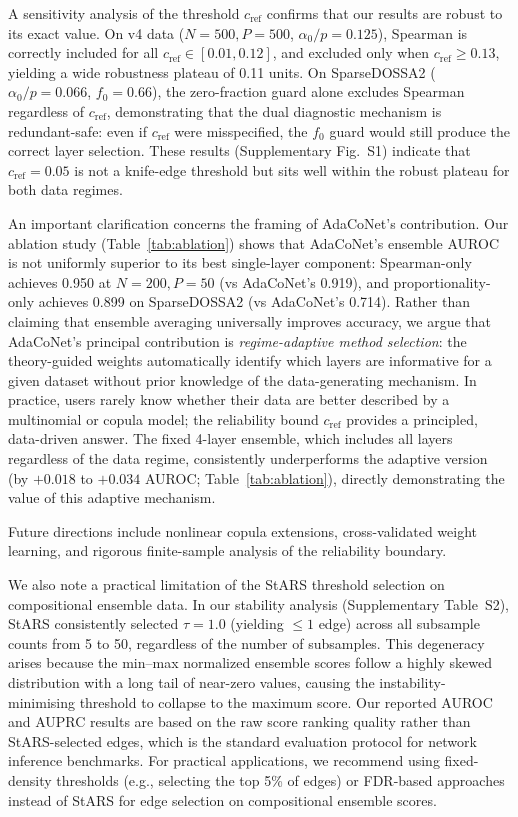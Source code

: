 \documentclass[unnumsec,webpdf,contemporary,large,numbered]{oup-authoring-template}
\theoremstyle{plain}
\theoremstyle{definition}
\begin{document}
A sensitivity analysis of the threshold $c_{\text{ref}}$ confirms that our results are robust to its exact value. On v4 data ($N{=}500, P{=}500$, $\alpha_0/p = 0.125$), Spearman is correctly included for all $c_{\text{ref}} \in [0.01, 0.12]$, and excluded only when $c_{\text{ref}} \geq 0.13$, yielding a wide robustness plateau of 0.11 units. On SparseDOSSA2 ($\alpha_0/p = 0.066$, $f_0 = 0.66$), the zero-fraction guard alone excludes Spearman regardless of $c_{\text{ref}}$, demonstrating that the dual diagnostic mechanism is redundant-safe: even if $c_{\text{ref}}$ were misspecified, the $f_0$ guard would still produce the correct layer selection. These results (Supplementary Fig.~S1) indicate that $c_{\text{ref}} = 0.05$ is not a knife-edge threshold but sits well within the robust plateau for both data regimes.

An important clarification concerns the framing of AdaCoNet's contribution. Our ablation study (Table~\ref{tab:ablation}) shows that AdaCoNet's ensemble AUROC is not uniformly superior to its best single-layer component: Spearman-only achieves 0.950 at $N{=}200, P{=}50$ (vs AdaCoNet's 0.919), and proportionality-only achieves 0.899 on SparseDOSSA2 (vs AdaCoNet's 0.714). Rather than claiming that ensemble averaging universally improves accuracy, we argue that AdaCoNet's principal contribution is \emph{regime-adaptive method selection}: the theory-guided weights automatically identify which layers are informative for a given dataset without prior knowledge of the data-generating mechanism. In practice, users rarely know whether their data are better described by a multinomial or copula model; the reliability bound $c_{\text{ref}}$ provides a principled, data-driven answer. The fixed 4-layer ensemble, which includes all layers regardless of the data regime, consistently underperforms the adaptive version (by $+0.018$ to $+0.034$ AUROC; Table~\ref{tab:ablation}), directly demonstrating the value of this adaptive mechanism.

Future directions include nonlinear copula extensions, cross-validated weight learning, and rigorous finite-sample analysis of the reliability boundary.

We also note a practical limitation of the StARS threshold selection on compositional ensemble data. In our stability analysis (Supplementary Table~S2), StARS consistently selected $\tau = 1.0$ (yielding $\leq 1$ edge) across all subsample counts from 5 to 50, regardless of the number of subsamples. This degeneracy arises because the min--max normalized ensemble scores follow a highly skewed distribution with a long tail of near-zero values, causing the instability-minimising threshold to collapse to the maximum score. Our reported AUROC and AUPRC results are based on the raw score ranking quality rather than StARS-selected edges, which is the standard evaluation protocol for network inference benchmarks. For practical applications, we recommend using fixed-density thresholds (e.g., selecting the top 5\% of edges) or FDR-based approaches instead of StARS for edge selection on compositional ensemble scores.
\end{document}
